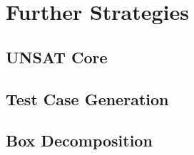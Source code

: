\chapter{Further Strategies}
\section{UNSAT Core}
\section{Test Case Generation}
\section{Box Decomposition}